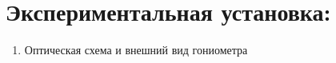 \section*{Экспериментальная установка:}
\begin{enumerate}
    \item Оптическая схема и внешний вид гониометра
    \begin{figure}[h!]
        \noindent{}
    \end{figure} 
    
\end{enumerate}
